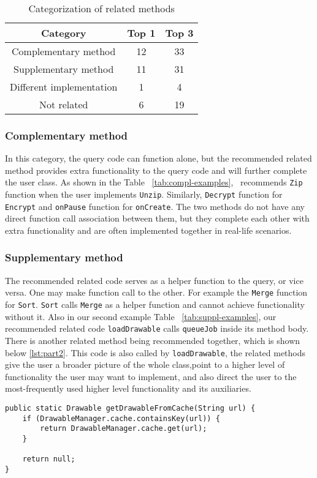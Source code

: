 \begin{table}
	\begin{center}
		\begin{tabular}{ c|c|c } 
			Category & Top 1 & Top 3 \\\hline
			Complementary method &  12 & 33\\\hline 
			Supplementary method &  11 & 31 \\ \hline
			Different implementation &  1 & 4 \\ \hline
			Not related &6 & 19
		\end{tabular}		
	\end{center}
	\caption{Categorization of related methods}
	\label{tab:categorization}
\end{table}
	
	

\subsubsection{Complementary method} In this category, the query code can function alone, but the recommended related method provides extra functionality to the query code and will further complete the user class. As shown in the Table ~\ref{tab:compl-examples}, \tool\ recommends \texttt{Zip} function when the user implements \texttt{Unzip}. Similarly, \texttt{Decrypt} function for \texttt{Encrypt} and \texttt{onPause} function for \texttt{onCreate}. The two methods do not have any direct function call association between them, but they complete each other with extra functionality and are often implemented together in real-life scenarios. 

\subsubsection{Supplementary method} The recommended related code serves as a helper function to the query, or vice versa. One may make function call to the other. For example the \texttt{Merge} function for \texttt{Sort}. \texttt{Sort} calls \texttt{Merge} as a helper function and cannot achieve functionality without it. Also in our second example Table ~\ref{tab:suppl-examples}, our recommended related code \texttt{loadDrawable} calls \texttt{queueJob} inside its method body. There is another related method being recommended together, which is shown below \ref{lst:part2}. This code is also called by \texttt{loadDrawable}, the related methods give the user a broader picture of the whole class,point to a higher level of functionality the user may want to implement, and also direct the user to the most-frequently used higher level functionality and its auxiliaries.
\begin{lstlisting}[caption={Recommended code \#2}, label={lst:part2}]
public static Drawable getDrawableFromCache(String url) {
	if (DrawableManager.cache.containsKey(url)) {
		return DrawableManager.cache.get(url);
	}
	
	return null;
}	
\end{lstlisting}

